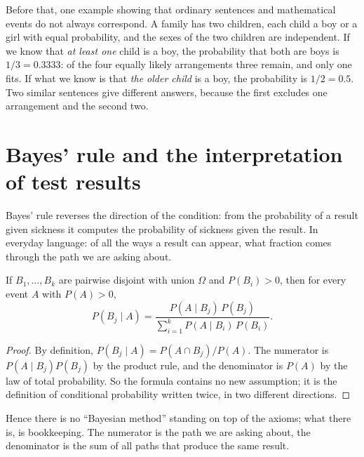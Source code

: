 Before that, one example showing that ordinary sentences and mathematical events do not
always correspond. A family has two children, each child a boy or a girl with equal
probability, and the sexes of the two children are independent. If we know that
\emph{at least one} child is a boy, the probability that both are boys is $1/3=0.3333$: of
the four equally likely arrangements three remain, and only one fits. If what we know is
that \emph{the older child} is a boy, the probability is $1/2=0.5$. Two similar sentences
give different answers, because the first excludes one arrangement and the second two.

\section{Bayes' rule and the interpretation of test results}

Bayes' rule reverses the direction of the condition: from the probability of a result given
sickness it computes the probability of sickness given the result. In everyday language: of
all the ways a result can appear, what fraction comes through the path we are asking about.


\begin{teorema}
If $B_{1},\dots,B_{k}$ are pairwise disjoint with union $\Omega$ and $P(B_{i})>0$, then
for every event $A$ with $P(A)>0$,
\[
P(B_{j}\mid A)=\frac{P(A\mid B_{j})\,P(B_{j})}
{\sum_{i=1}^{k}P(A\mid B_{i})\,P(B_{i})}.
\]
\end{teorema}

\begin{proof}
By definition, $P(B_{j}\mid A)=P(A\cap B_{j})/P(A)$. The numerator is
$P(A\mid B_{j})P(B_{j})$ by the product rule, and the denominator is $P(A)$ by the law of
total probability. So the formula contains no new assumption; it is the definition of
conditional probability written twice, in two different directions.
\end{proof}

Hence there is no ``Bayesian method'' standing on top of the axioms; what there is, is
bookkeeping. The numerator is the path we are asking about, the denominator is the sum of
all paths that produce the same result.


